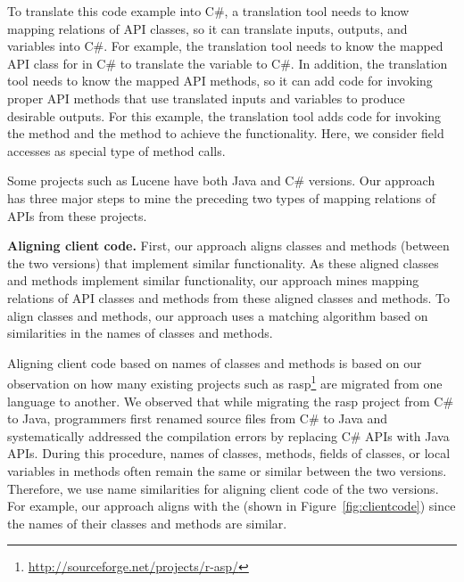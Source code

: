 To translate this code example into C\#, a translation tool needs to
know mapping relations of API classes, so it can translate inputs,
outputs, and variables into C\#. For example, the translation tool
needs to know the mapped API class for  in C\#
to translate the variable  to C\#. In addition, the
translation tool needs to know the mapped API methods, so it can
add code for invoking proper API methods that use translated inputs and variables to
produce desirable outputs. For this example, the translation tool
adds code for invoking the  method and the 
 method to achieve the functionality. 
Here, we consider field accesses as special type of method calls.

Some projects such as Lucene have both Java and C\# versions. Our
approach has three major steps to mine the preceding two types of
mapping relations of APIs from these projects.

\textbf{Aligning client code.} First, our approach aligns classes
and methods (between the two versions) that implement similar functionality.
As these aligned classes and methods implement similar functionality,
our approach mines mapping relations of API classes and methods from
these aligned classes and methods. To align classes and methods, our approach uses a 
matching algorithm based on similarities in the names of classes and methods. 

Aligning client code based on names of classes and methods
is based on our observation on how many existing projects such as
rasp\footnote{\url{http://sourceforge.net/projects/r-asp/}} are
migrated from one language to another. We observed that while
migrating the rasp project from C\# to Java, programmers first renamed
source files from C\# to Java and systematically addressed the
compilation errors by replacing C\# APIs with Java APIs. During this
procedure, names of classes, methods, fields of classes, or local
variables in methods often remain the same or similar between the two versions.
Therefore, we use name similarities for aligning client code of the
two versions. For example, our approach aligns
 with the  (shown in
Figure~\ref{fig:clientcode}) since the names of their classes and
methods are similar.

